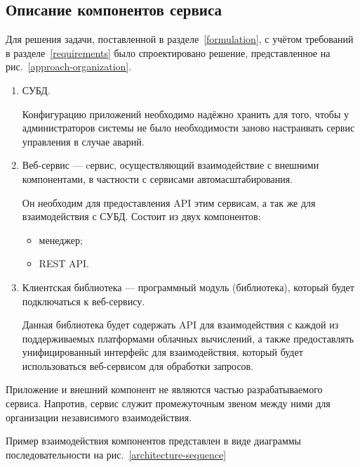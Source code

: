 \subsection{Описание компонентов сервиса}
Для решения задачи, поставленной в разделе~\ref{formulation}, с учётом требований в разделе~\ref{requirements} было спроектировано решение, представленное на рис.~\ref{approach-organization}.
\begin{enumerate}
    \item СУБД.
    
    Конфигурацию приложений необходимо надёжно хранить для того, чтобы у администраторов системы не было необходимости заново настраивать сервис управления в случае аварий.
    
    \item Веб-сервис --- cервис, осуществляющий взаимодействие с внешними компонентами, в частности с сервисами автомасштабирования. 
    
    Он необходим для предоставления API этим сервисам, а так же для взаимодействия с СУБД.
    Состоит из двух компонентов: 
    \begin{itemize}
        \item менеджер;
        \item REST API.
    \end{itemize}
    \item Клиентская библиотека --- программный модуль (библиотека), который будет подключаться к веб-сервису.
    
    Данная библиотека будет содержать API для взаимодействия с каждой из поддерживаемых платформами облачных вычислений, а также предоставлять унифицированный интерфейс для взаимодействия, который будет использоваться веб-сервисом для обработки запросов.
\end{enumerate}

Приложение и внешний компонент не являются частью разрабатываемого сервиса.
Напротив, сервис служит промежуточным звеном между ними для организации независимого взаимодействия.

Пример взаимодействия компонентов представлен в виде диаграммы последовательности на рис.~\ref{architecture-sequence}

